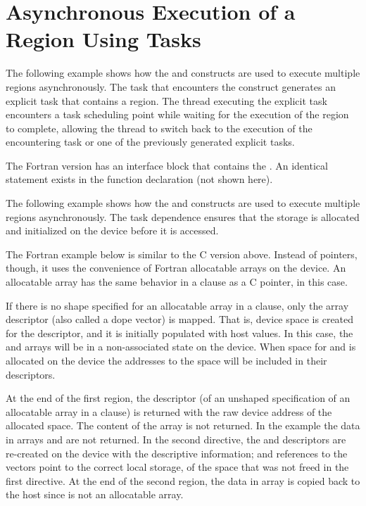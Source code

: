 \pagebreak
\chapter{Asynchronous Execution of a  Region Using Tasks}
\label{chap:async_target}

The following example shows how the  and  constructs 
are used to execute multiple  regions asynchronously. The task that 
encounters the  construct generates an explicit task that contains 
a  region. The thread executing the explicit task encounters a task 
scheduling point while waiting for the execution of the  region 
to complete, allowing the thread to switch back to the execution of the encountering 
task or one of the previously generated explicit tasks.


The Fortran version has an interface block that contains the  . 
An identical statement exists in the function declaration (not shown here).


The following example shows how the  and  constructs 
are used to execute multiple  regions asynchronously. The task dependence 
ensures that the storage is allocated and initialized on the device before it is 
accessed.


The Fortran example below is similar to the C version above. Instead of pointers, though, it uses
the convenience of Fortran allocatable arrays on the device. An allocatable array has the
same behavior in a  clause as a C pointer, in this case.

If there is no shape specified for an allocatable array in a  clause, only the array descriptor
(also called a dope vector) is mapped. That is, device space is created for the descriptor, and it
is initially populated with host values. In this case, the  and  arrays will be in a
non-associated state on the device. When space for  and  is allocated on the device
the addresses to the space will be included in their descriptors.

At the end of the first  region, the descriptor (of an unshaped specification of an allocatable
array in a  clause) is returned with the raw device address of the allocated space.
The content of the array is not returned. In the example the data in arrays  and 
are not returned. In the second  directive, the  and  descriptors are
re-created on the device with the descriptive information; and references to the
vectors point to the correct local storage, of the space that was not freed in the first 
directive.  At the end of the second  region, the data in array  is copied back
to the host since  is not an allocatable array.

